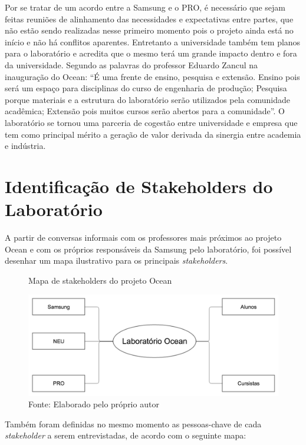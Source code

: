 Por se tratar de um acordo entre a Samsung e o PRO, é necessário que sejam feitas reuniões de alinhamento das necessidades e expectativas entre partes, que não estão sendo realizadas nesse primeiro momento pois o projeto ainda está no início e não há conflitos aparentes. Entretanto a universidade também tem planos para o laboratório e acredita que o mesmo terá um grande impacto dentro e fora da universidade. Segundo as palavras do professor Eduardo Zancul na inauguração do Ocean: “É uma frente de ensino, pesquisa e extensão. Ensino pois será um espaço para disciplinas do curso de engenharia de produção; Pesquisa porque materiais e a estrutura do laboratório serão utilizados pela comunidade acadêmica; Extensão pois muitos cursos serão abertos para a comunidade”. O laboratório se tornou uma parceria de cogestão entre universidade e empresa que tem como principal mérito a geração de valor derivada da sinergia entre academia e indústria. 

\section{Identificação de Stakeholders do Laboratório}
\label{sec:identificacao_stakeholders}

A partir de conversas informais com os professores mais próximos ao projeto Ocean e com os próprios responsáveis da Samsung pelo laboratório, foi possível desenhar um mapa ilustrativo para os principais \textit{stakeholders}.

\begin{figure}[H]
\caption{Mapa de stakeholders do projeto Ocean}
\centerline{\includegraphics[scale=0.5]{img/stakeholders_v2}}
\label{fig:stakeholders}
\caption* {Fonte: Elaborado pelo próprio autor}
\end{figure}

Também foram definidas no mesmo momento as pessoas-chave de cada \textit{stakeholder} a serem entrevistadas, de acordo com o seguinte mapa:

